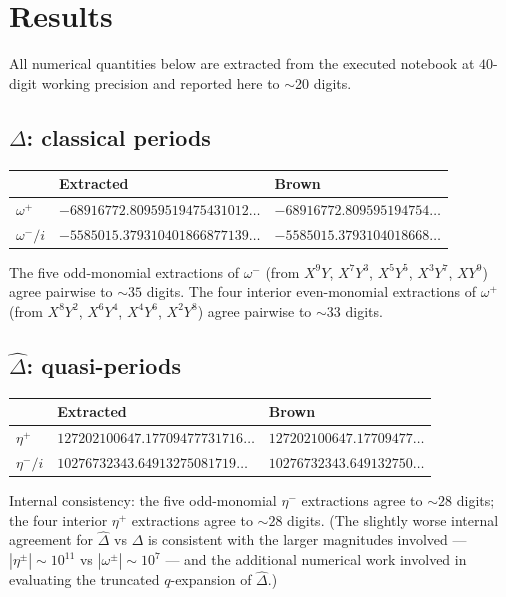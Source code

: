 \documentclass[11pt,letterpaper]{article}
\newcommand{\Dhat}{\widehat{\Delta}}
\begin{document}
\section{Results}\label{sec:results}

All numerical quantities below are extracted from the executed notebook \cite{Notebook} at $40$-digit working precision and reported here to $\sim$20 digits.

\subsection*{$\Delta$: classical periods}
\begin{center}
\begin{tabular}{lll}
\toprule
& \textbf{Extracted \cite{Notebook}} & \textbf{Brown \cite[\S 8.3]{Brown2017}} \\
\midrule
$\omega^+$       & $-68916772.80959519475431012\ldots$ & $-68916772.809595194754\ldots$ \\
$\omega^- / i$   & $-5585015.379310401866877139\ldots$ & $-5585015.3793104018668\ldots$ \\
\bottomrule
\end{tabular}
\end{center}

The five odd-monomial extractions of $\omega^-$ (from $X^9 Y$, $X^7 Y^3$, $X^5 Y^5$, $X^3 Y^7$, $X Y^9$) agree pairwise to $\sim 35$ digits. The four interior even-monomial extractions of $\omega^+$ (from $X^8 Y^2$, $X^6 Y^4$, $X^4 Y^6$, $X^2 Y^8$) agree pairwise to $\sim 33$ digits.

\subsection*{$\widehat{\Delta}$: quasi-periods}
\begin{center}
\begin{tabular}{lll}
\toprule
& \textbf{Extracted \cite{Notebook}} & \textbf{Brown \cite[\S 8.3]{Brown2017}} \\
\midrule
$\eta^+$       & $127202100647.17709477731716\ldots$ & $127202100647.17709477\ldots$ \\
$\eta^- / i$   & $10276732343.64913275081719\ldots$  & $10276732343.649132750\ldots$ \\
\bottomrule
\end{tabular}
\end{center}

Internal consistency: the five odd-monomial $\eta^-$ extractions agree to $\sim 28$ digits; the four interior $\eta^+$ extractions agree to $\sim 28$ digits. (The slightly worse internal agreement for $\Dhat$ vs $\Delta$ is consistent with the larger magnitudes involved — $|\eta^\pm| \sim 10^{11}$ vs $|\omega^\pm| \sim 10^{7}$ — and the additional numerical work involved in evaluating the truncated $q$-expansion of $\Dhat$.)
\end{document}
